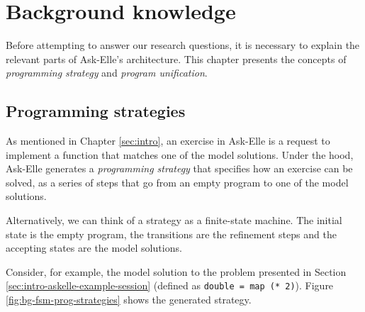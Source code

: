 \chapter{Background knowledge}
\label{sec:background}

Before attempting to answer our research questions, it is necessary to explain the relevant parts of Ask-Elle's architecture. This chapter presents the concepts of \emph{programming strategy} and \emph{program unification}.

\section{Programming strategies}

As mentioned in Chapter \ref{sec:intro}, an exercise in Ask-Elle is a request to implement a function that matches one of the model solutions. Under the hood, Ask-Elle  generates a \emph{programming strategy} that specifies how an exercise can be solved, as a series of steps that go from an empty program to one of the model solutions.

Alternatively, we can think of a strategy as a finite-state machine. The initial state is the empty program, the transitions are the refinement steps and the accepting states are the model solutions.

Consider, for example, the model solution to the problem presented in Section \ref{sec:intro-askelle-example-session} (defined as \texttt{double = map (* 2)}). Figure \ref{fig:bg-fsm-prog-strategies} shows the generated strategy.

